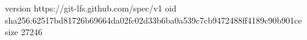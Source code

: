 version https://git-lfs.github.com/spec/v1
oid sha256:62517bd81726b69664da02fc02d33b6ba0a539c7cb9472488ff4189c90b901ce
size 27246
